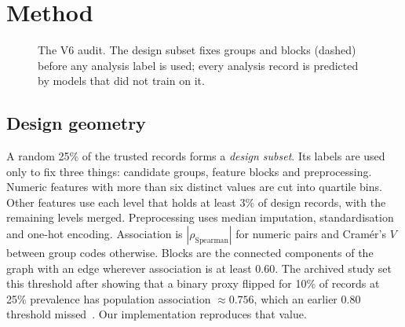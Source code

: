 \documentclass[conference]{IEEEtran}
\newcommand{\Vsix}{V6}
\begin{document}
\section{Method}
\begin{figure}[t]
\centering
{}
\caption{The \Vsix{} audit. The design subset fixes groups and blocks (dashed) before any analysis label is used; every analysis record is predicted by models that did not train on it.}
\label{fig:pipeline}
\end{figure}

\subsection{Design geometry}
A random 25\% of the trusted records forms a \emph{design subset}. Its labels are used only to fix three things: candidate groups, feature blocks and preprocessing. Numeric features with more than six distinct values are cut into quartile bins. Other features use each level that holds at least 3\% of design records, with the remaining levels merged. Preprocessing uses median imputation, standardisation and one-hot encoding. Association is $|\rho_{\text{Spearman}}|$ for numeric pairs and Cram\'er's $V$ between group codes otherwise. Blocks are the connected components of the graph with an edge wherever association is at least $0.60$. The archived study set this threshold after showing that a binary proxy flipped for 10\% of records at 25\% prevalence has population association $\approx0.756$, which an earlier 0.80 threshold missed~\cite{salwan2026report}. Our implementation reproduces that value.
\end{document}
